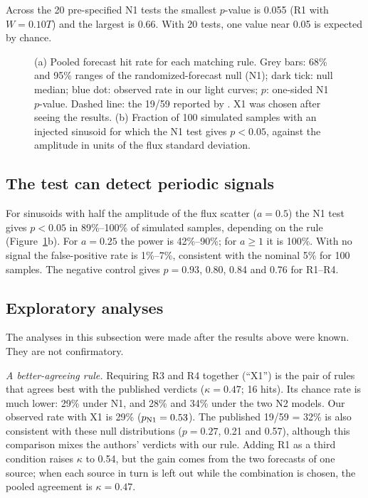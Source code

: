 \documentclass[twocolumn]{aastex631}
\begin{document}
Across the 20 pre-specified N1 tests the smallest $p$-value is 0.055 (R1 with $W=0.10T$) and the largest is 0.66. With 20 tests, one value near 0.05 is expected by chance.

\begin{figure}[ht!]
\caption{(a) Pooled forecast hit rate for each matching rule. Grey bars: 68\% and 95\% ranges of the randomized-forecast null (N1); dark tick: null median; blue dot: observed rate in our light curves; $p$: one-sided N1 $p$-value. Dashed line: the 19/59 reported by \citet{penil26}. X1 was chosen after seeing the results. (b) Fraction of 100 simulated samples with an injected sinusoid for which the N1 test gives $p<0.05$, against the amplitude in units of the flux standard deviation.\label{fig:1}}
\end{figure}

\subsection{The test can detect periodic signals}

For sinusoids with half the amplitude of the flux scatter ($a=0.5$) the N1 test gives $p<0.05$ in 89\%--100\% of simulated samples, depending on the rule (Figure~\ref{fig:1}b). For $a=0.25$ the power is 42\%--90\%; for $a\ge1$ it is 100\%. With no signal the false-positive rate is 1\%--7\%, consistent with the nominal 5\% for 100 samples. The negative control gives $p = 0.93$, 0.80, 0.84 and 0.76 for R1--R4.

\subsection{Exploratory analyses} \label{sec:explore}

The analyses in this subsection were made after the results above were known. They are not confirmatory.

\textit{A better-agreeing rule.} Requiring R3 and R4 together (``X1'') is the pair of rules that agrees best with the published verdicts ($\kappa=0.47$; 16 hits). Its chance rate is much lower: 29\% under N1, and 28\% and 34\% under the two N2 models. Our observed rate with X1 is 29\% ($p_{\rm N1}=0.53$). The published 19/59 = 32\% is also consistent with these null distributions ($p = 0.27$, 0.21 and 0.57), although this comparison mixes the authors' verdicts with our rule. Adding R1 as a third condition raises $\kappa$ to 0.54, but the gain comes from the two forecasts of one source; when each source in turn is left out while the combination is chosen, the pooled agreement is $\kappa=0.47$.
\end{document}
